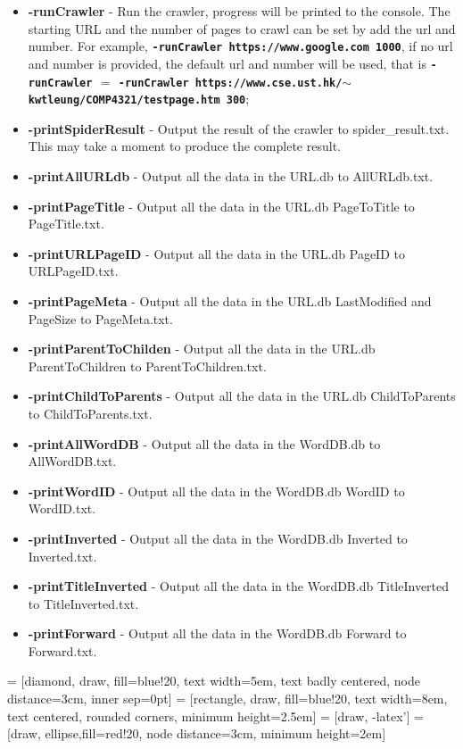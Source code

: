\documentclass{article}
\begin{document}
        \begin{itemize}
            \item \textbf{-runCrawler} - Run the crawler, progress will be printed to the console. The starting URL and the number of pages to crawl can be set by add the url and number. For example, \textbf{\texttt{-runCrawler https://www.google.com 1000}}, if no url and number is provided, the default url and number will be used, that is \textbf{\texttt{-runCrawler} $=$ \texttt{-runCrawler https://www.cse.ust.hk/$\sim$kwtleung/COMP4321/testpage.htm 300}};
            \item \textbf{-printSpiderResult} - Output the result of the crawler to spider\_result.txt. This may take a moment to produce the complete result.
            \item \textbf{-printAllURLdb} - Output all the data in the URL.db to AllURLdb.txt.
            \item \textbf{-printPageTitle} - Output all the data in the URL.db PageToTitle to PageTitle.txt.
            \item \textbf{-printURLPageID} - Output all the data in the URL.db PageID to URLPageID.txt.
            \item \textbf{-printPageMeta} - Output all the data in the URL.db LastModified and PageSize to PageMeta.txt.
            \item \textbf{-printParentToChilden} - Output all the data in the URL.db ParentToChildren to ParentToChildren.txt.
            \item \textbf{-printChildToParents} - Output all the data in the URL.db ChildToParents to ChildToParents.txt.
            \item \textbf{-printAllWordDB} - Output all the data in the WordDB.db to AllWordDB.txt.
            \item \textbf{-printWordID} - Output all the data in the WordDB.db WordID to WordID.txt.
            \item \textbf{-printInverted} - Output all the data in the WordDB.db Inverted to Inverted.txt.
            \item \textbf{-printTitleInverted} - Output all the data in the WordDB.db TitleInverted to TitleInverted.txt.
            \item \textbf{-printForward} - Output all the data in the WordDB.db Forward to Forward.txt.
        \end{itemize}

     = [diamond, draw, fill=blue!20, 
    text width=5em, text badly centered, node distance=3cm, inner sep=0pt]
     = [rectangle, draw, fill=blue!20, 
    text width=8em, text centered, rounded corners, minimum height=2.5em]
     = [draw, -latex']
     = [draw, ellipse,fill=red!20, node distance=3cm,
    minimum height=2em]
    
\end{document}
